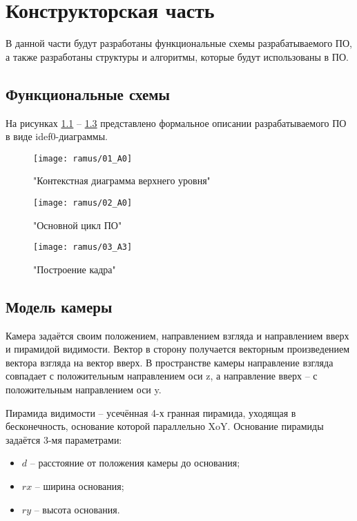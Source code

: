 \chapter{Конструкторская часть}

В данной части будут разработаны функциональные схемы разрабатываемого ПО, а также разработаны структуры и алгоритмы, которые будут использованы в ПО.

\section{Функциональные схемы} 

На рисунках \ref{fig:A0} -- \ref{fig:A3} представлено формальное описании разрабатываемого ПО в виде idef0-диаграммы.

\begin{figure}[H]
	\centering
	\texttt{[image: ramus/01\_A0]}
	\caption{"Контекстная диаграмма верхнего уровня"}
	\label{fig:A0}
\end{figure}

\begin{figure}[H]
	\centering
	\texttt{[image: ramus/02\_A0]}
	\caption{"Основной цикл ПО"}
	\label{fig:A1}
\end{figure}

\begin{figure}[H]
	\centering
	\texttt{[image: ramus/03\_A3]}
	\caption{"Построение кадра"}
	\label{fig:A3}
\end{figure}

\section{Модель камеры}

Камера задаётся своим положением, направлением взгляда и направлением вверх и пирамидой видимости. Вектор в сторону получается векторным произведением вектора взгляда на вектор вверх. В пространстве камеры направление взгляда совпадает с положительным направлением оси z, а направление вверх -- с положительным направлением оси y.


Пирамида видимости -- усечённая 4-х гранная пирамида, уходящая в бесконечность, основание которой параллельно XoY. Основание пирамиды задаётся 3-мя параметрами:

\begin{itemize}
	\item $d$ -- расстояние от положения камеры до основания;
	\item $rx$ -- ширина основания;
	\item $ry$ -- высота основания.
\end{itemize}

